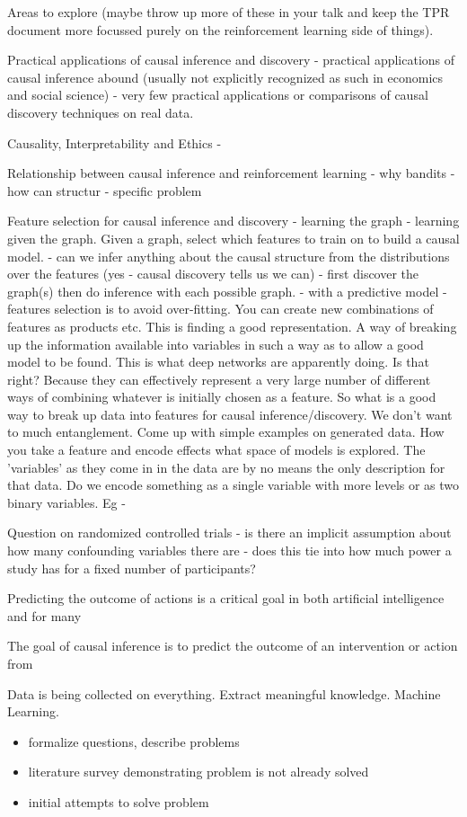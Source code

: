 \documentclass[11pt,a4paper]{article}
\begin{document}
Areas to explore (maybe throw up more of these in your talk and keep the TPR document more focussed purely on the reinforcement learning side of things). 

	Practical applications of causal inference and discovery
		- practical applications of causal inference abound (usually not explicitly recognized as such in economics and social science)
		- very few practical applications or comparisons of causal discovery techniques on real data. 

	Causality, Interpretability and Ethics
		- 	
	
	Relationship between causal inference and reinforcement learning
		- why bandits
		- how can structur
		- specific problem

	Feature selection for causal inference and discovery
		- learning the graph
		- learning given the graph. Given a graph, select which features to train on to build a causal model. 
		- can we infer anything about the causal structure from the distributions over the features (yes - causal discovery tells us we can)
		- first discover the graph(s) then do inference with each possible graph.
		- with a predictive model - features selection is to avoid over-fitting. You can create new combinations of features as products etc.
		This is finding a good representation. A way of breaking up the information available into variables in such a way as to allow a good model to be found. This is what deep networks are apparently doing. Is that right? Because they can effectively represent a very large number of different ways of combining whatever is initially chosen as a feature. So what is a good way to break up data into features for causal inference/discovery. We don't want to much entanglement. Come up with simple examples on generated data. How you take a feature and encode effects what space of models is explored. The 'variables' as they come in in the data are by no means the only description for that data. Do we encode something as a single variable with more levels or as two binary variables. Eg -  

Question on randomized controlled trials - is there an implicit assumption about how many confounding variables there are - does this tie into how much power a study has for a fixed number of participants?

		
Predicting the outcome of actions is a critical goal in both artificial intelligence and for many 

The goal of causal inference is to predict the outcome of an intervention or action from

Data is being collected on everything. Extract meaningful knowledge. Machine Learning. 

\begin{itemize}
\item formalize questions, describe problems
\item literature survey demonstrating problem is not already solved
\item initial attempts to solve problem
\end{itemize}
\end{document}
